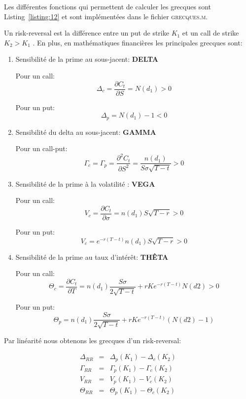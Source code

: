 Les différentes fonctions qui permettent de calculer les grecques sont Listing~\ref{listing:12} et sont implémentées dans le fichier \textsc{grecques.m}.

Un risk-reversal est la différence entre un put de strike $K_{1}$ et un call de strike $K_{2}>K_{1}$ .
En plus, en mathématiques financières les principales grecques sont:

\begin{enumerate}
\item Sensibilité de la prime au sous-jacent: {\bfseries DELTA}


Pour un call: \[\Delta_{c}=\frac{\partial C_{t}}{\partial S}=N(d_{1}) >0\]

Pour un put:  \[\Delta_{p}=N(d_{1})-1 <0\]


\item Sensibilité du delta au sous-jacent: {\bfseries GAMMA} 

Pour un call-put: \[\Gamma_{c}=\Gamma_{p}=\frac{\partial^{2} C_{t}}{\partial S^{2}}=\frac{n(d_{1})}{S\sigma\sqrt{T-t}} >0\]

\item 	Sensibilité de la prime à la volatilité : {\bfseries VEGA}

Pour un call: \[V_{c}=\frac{\partial C_{t}}{\partial \sigma}=n(d_{1})S\sqrt{T-r}>0\]

Pour un put:  \[V_{c}=e^{-r(T-t)}n(d_{1})S\sqrt{T-r}>0\]

\item Sensibilité de la prime au taux d'intérêt: {\bfseries THÊTA}

Pour un call: \[\Theta_{c}=\frac{\partial C_{t}}{\partial T}=n(d_{1})\frac{S\sigma}{2\sqrt{T-t}}+rKe^{-r(T-t)}N(d2) >0\]

Pour un put:  \[\Theta_{p}=n(d_{1})\frac{S\sigma}{2\sqrt{T-t}}+rKe^{-r(T-t)}(N(d2)-1) \]

\end{enumerate}

Par linéarité nous obtenons les grecques d'un risk-reversal:

\begin{eqnarray}
\Delta_{RR} &=& \Delta_{p}(K_{1}) - \Delta_{c}(K_{2}) \\
\Gamma_{RR} &=& \Gamma_{p}(K_{1}) - \Gamma_{c}(K_{2})\\
V_{RR} &=& V_{p}(K_{1}) - V_{c}(K_{2})\\
\Theta_{RR} &=& \Theta_{p}(K_{1}) - \Theta_{c}(K_{2})
\end{eqnarray}

